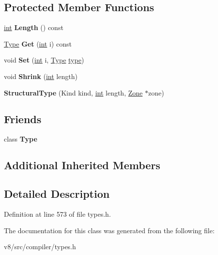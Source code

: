 \subsection*{Protected Member Functions}
\begin{DoxyCompactItemize}
\item 
\mbox{\label{classv8_1_1internal_1_1compiler_1_1StructuralType_ab9184f32e0596d9f511a962c661d3153}} 
\mbox{\hyperlink{classint}{int}} {\bfseries Length} () const
\item 
\mbox{\label{classv8_1_1internal_1_1compiler_1_1StructuralType_af2ff6677d77a6e8e5455eba9f3ce3080}} 
\mbox{\hyperlink{classv8_1_1internal_1_1compiler_1_1Type}{Type}} {\bfseries Get} (\mbox{\hyperlink{classint}{int}} i) const
\item 
\mbox{\label{classv8_1_1internal_1_1compiler_1_1StructuralType_ae197ff156b6de4623ecdba5b140cad0c}} 
void {\bfseries Set} (\mbox{\hyperlink{classint}{int}} i, \mbox{\hyperlink{classv8_1_1internal_1_1compiler_1_1Type}{Type}} \mbox{\hyperlink{classstd_1_1conditional_1_1type}{type}})
\item 
\mbox{\label{classv8_1_1internal_1_1compiler_1_1StructuralType_a5a56de438e75c6241c04f023e474e622}} 
void {\bfseries Shrink} (\mbox{\hyperlink{classint}{int}} length)
\item 
\mbox{\label{classv8_1_1internal_1_1compiler_1_1StructuralType_ad6d4803e497508669e75967c1f828da0}} 
{\bfseries Structural\+Type} (Kind kind, \mbox{\hyperlink{classint}{int}} length, \mbox{\hyperlink{classv8_1_1internal_1_1Zone}{Zone}} $\ast$zone)
\end{DoxyCompactItemize}
\subsection*{Friends}
\begin{DoxyCompactItemize}
\item 
\mbox{\label{classv8_1_1internal_1_1compiler_1_1StructuralType_a18dba29b4f3e91d6d2bc53472a6bb7cc}} 
class {\bfseries Type}
\end{DoxyCompactItemize}
\subsection*{Additional Inherited Members}


\subsection{Detailed Description}


Definition at line 573 of file types.\+h.



The documentation for this class was generated from the following file\+:\begin{DoxyCompactItemize}
\item 
v8/src/compiler/types.\+h\end{DoxyCompactItemize}
